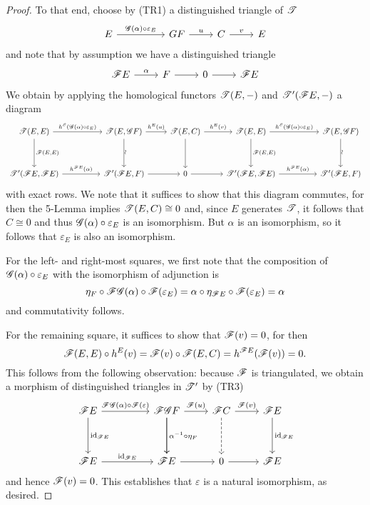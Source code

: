 \documentclass[dissertation.tex]{subfiles}
\begin{document}
\begin{cor}
\begin{proof}
    To that end, choose by (TR1) a distinguished triangle of $\mathscr{T}$
    $$\begin{tikzcd}
      E \arrow{rr}{\G(\alpha) \circ \varepsilon_E} && GF \arrow{r}{u} & C \arrow{r}{v} & E
    \end{tikzcd}$$
    and note that by assumption we have a distinguished triangle
    $$\begin{tikzcd}
      \F E \arrow{r}{\alpha} & F \arrow{r} & 0 \arrow{r} & \F E
    \end{tikzcd}$$
    We obtain by applying the homological functors $\mathscr{T}(E, -)$ and $\mathscr{T}^\prime(\mathscr{F} E, - )$ a diagram
    $$\begin{tikzcd}
      \T(E,E) \arrow{rr}{h^{\E}(\G(\alpha) \circ \varepsilon_E)}\arrow{dd}{\F(E,E)} && \T(E,\G F) \arrow{r}{h^E(u)}\arrow{dd}[rotate=90,yshift=-.5ex,xshift=-1ex]{\sim} & \T(E,C) \arrow{r}{h^E(v)}\arrow{dd} & \T(E,E) \arrow{rr}{h^{\E}(\G(\alpha) \circ \varepsilon_E)}\arrow{dd}{\F(E,E)} && \T(E, \G F)\arrow{dd}[rotate=90,yshift=-.5ex,xshift=-1ex]{\sim}\\
      \\
      \T^\prime(\F E, \F E) \arrow{rr}{h^{\F E}(\alpha)} && \T^\prime(\F E, F) \arrow{r} & 0 \arrow{r} & \T^\prime(\F E, \F E) \arrow{rr}{h^{\F E}(\alpha)} && \T^\prime(\F E, F)
    \end{tikzcd}$$
    with exact rows.
    We note that it suffices to show that this diagram commutes, for then the 5-Lemma implies $\mathscr{T}(E,C) \cong 0$ and, since $E$ generates $\mathscr{T}$, it follows that $C \cong 0$ and thus $\mathscr{G}(\alpha) \circ \varepsilon_E$ is an isomorphism.
    But $\alpha$ is an isomorphism, so it follows that $\varepsilon_E$ is also an isomorphism.

    For the left- and right-most squares, we first note that the composition of $\mathscr{G}(\alpha) \circ \varepsilon_E$ with the isomorphism of adjunction is
    $$\eta_F \circ \mathscr{F}\mathscr{G}(\alpha) \circ \mathscr{F}(\varepsilon_E) = \alpha \circ \eta_{\mathscr{F} E} \circ \mathscr{F}(\varepsilon_E) = \alpha$$
    and commutativity follows.

    For the remaining square, it suffices to show that $\mathscr{F}(v) = 0$, for then
    $$\mathscr{F}(E,E) \circ h^E(v) = \mathscr{F}(v) \circ \mathscr{F}(E,C) = h^{\mathscr{F} E}(\mathscr{F}(v)) = 0.$$
    This follows from the following observation: because $\mathscr{F}$ is triangulated, we obtain a morphism of distinguished triangles in $\mathscr{T}^\prime$ by (TR3)
    $$\begin{tikzcd}
      \F E \arrow{rr}{\F\G(\alpha) \circ \F(\varepsilon)} \arrow{dd}{\id_{\F E}} &&
      \F\G F \arrow{dd} \arrow{r}{\F(u)}\arrow{dd}{\alpha^{-1} \circ \eta_{F}} &
      \F C \arrow{r}{\F(v)} \arrow[dashed]{dd} &
      \F E \arrow{dd}{\id_{\F E}}\\\\
      \F E \arrow{rr}{\id_{\F E}} && \F E \arrow{r} & 0 \arrow{r} & \F E
    \end{tikzcd}$$
    and hence $\mathscr{F}(v) = 0$.
    This establishes that $\varepsilon$ is a natural isomorphism, as desired.
  \end{proof}
\end{cor}
\end{document}
